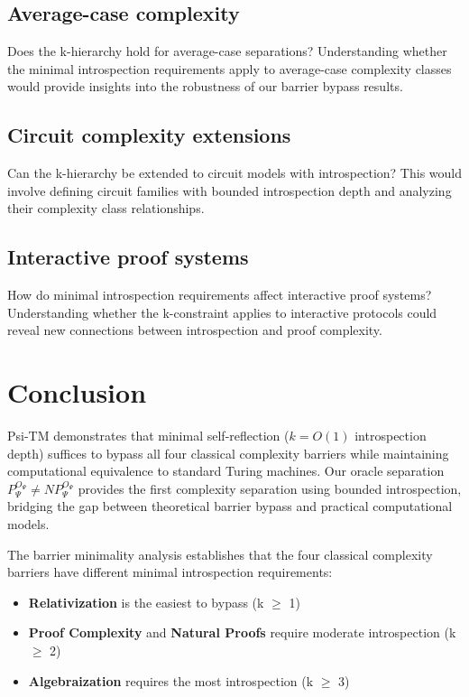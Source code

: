 \documentclass[11pt]{article}
\theoremstyle{definition}
\begin{document}
\subsection{Average-case complexity}
Does the k-hierarchy hold for average-case separations? Understanding whether the minimal introspection requirements apply to average-case complexity classes would provide insights into the robustness of our barrier bypass results.

\subsection{Circuit complexity extensions}
Can the k-hierarchy be extended to circuit models with introspection? This would involve defining circuit families with bounded introspection depth and analyzing their complexity class relationships.

\subsection{Interactive proof systems}
How do minimal introspection requirements affect interactive proof systems? Understanding whether the k-constraint applies to interactive protocols could reveal new connections between introspection and proof complexity.

\section{Conclusion}

Psi-TM demonstrates that minimal self-reflection ($k = O(1)$ introspection depth) suffices to bypass all four classical complexity barriers while maintaining computational equivalence to standard Turing machines. Our oracle separation $P^{O_\Psi}_\Psi \neq NP^{O_\Psi}_\Psi$ provides the first complexity separation using bounded introspection, bridging the gap between theoretical barrier bypass and practical computational models.

The barrier minimality analysis establishes that the four classical complexity barriers have different minimal introspection requirements:
\begin{itemize}
\item \textbf{Relativization} is the easiest to bypass (k $\geq$ 1)
\item \textbf{Proof Complexity} and \textbf{Natural Proofs} require moderate introspection (k $\geq$ 2)
\item \textbf{Algebraization} requires the most introspection (k $\geq$ 3)
\end{itemize}
\end{document}
